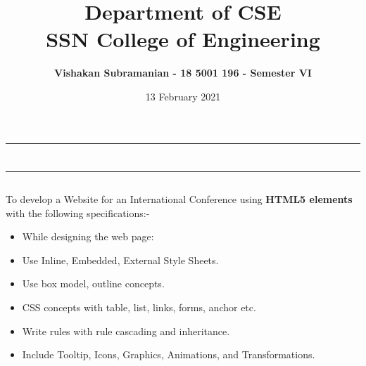 \documentclass[12pt, a4]{article}
\title{\textbf{Department of CSE\\SSN College of Engineering}}
\author{\textbf{Vishakan Subramanian - 18 5001 196 - Semester VI}}
\date{13 February 2021}
\begin{document}
\maketitle
\hrule
\section*{}
\hrule
\bigskip

\subsection*{}
\subsection*{}
\begin{flushleft}
To develop a Website for an International Conference using \textbf{HTML5 elements} with the following specifications:-

\begin{itemize}
\item While designing the web page:
\item Use Inline, Embedded, External Style Sheets.
\item Use box model, outline concepts.
\item CSS concepts with table, list, links, forms, anchor etc.
\item Write rules with rule cascading and inheritance.
\item Include Tooltip, Icons, Graphics, Animations, and Transformations.
\end{itemize}
 
\end{flushleft}

\newpage
\subsection*{}
\begin{flushleft}

\end{flushleft}

\newpage
\subsection*{}
\begin{flushleft}

\end{flushleft}
\end{document}
